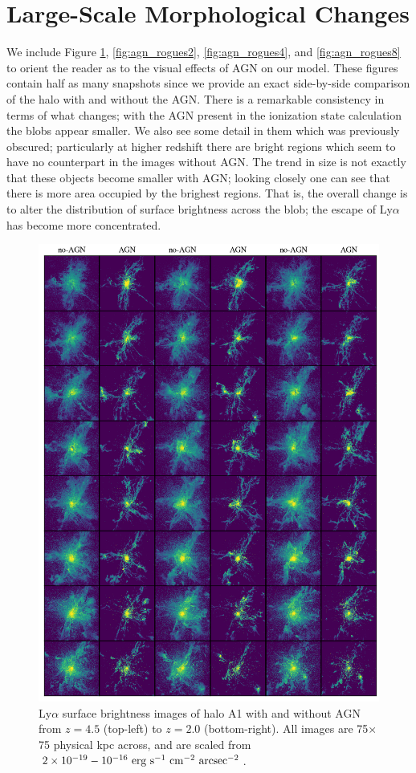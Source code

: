 \section{Large-Scale Morphological Changes}
We include Figure \ref{fig:agn_rogues1}, \ref{fig:agn_rogues2}, \ref{fig:agn_rogues4}, and \ref{fig:agn_rogues8} to orient the reader as to the visual effects of AGN on our model.
These figures contain half as many snapshots since we provide an exact side-by-side comparison of the halo with and without the AGN.
There is a remarkable consistency in terms of what changes; with the AGN present in the ionization state calculation the blobs appear smaller.
We also see some detail in them which was previously obscured; particularly at higher redshift there are bright regions which seem to have no counterpart in the images without AGN.
The trend in size is not exactly that these objects become smaller with AGN; looking closely one can see that there is more area occupied by the brighest regions.
That is, the overall change is to alter the distribution of surface brightness across the blob; the escape of Ly$\alpha$ has become more concentrated.

\begin{figure}
    \centering
    \includegraphics[width=\textwidth,keepaspectratio]{figures/agn_rogues_A1.png}
    \caption{
        Ly$\alpha$ surface brightness images of halo A1 with and without AGN from $z=4.5$ (top-left) to $z=2.0$ (bottom-right).
        All images are 75$\times$75 physical kpc across, and are scaled from $2\times 10^{-19}-10^{-16}\ \rm{erg}\ \rm{s}^{-1}\ \rm{cm}^{-2}\ \rm{arcsec}^{-2}$.
    }
  \label{fig:agn_rogues1}
\end{figure}

